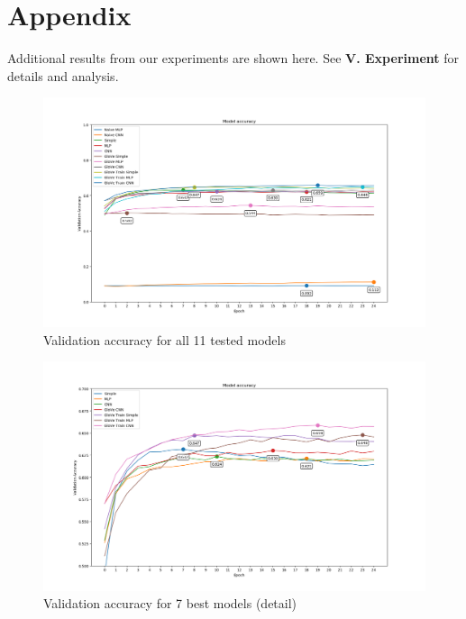 \documentclass[jou,apacite, 10px]{apa6}
\begin{document}
\onecolumn

\section*{Appendix}
Additional results from our experiments are shown here. See \textbf{V. Experiment} for details and analysis.

\begin{figure}[h!]
    \captionsetup{justification=centering}
  \centering
    \includegraphics[width=0.9\columnwidth]{images/all_models_comparison}
  \caption{Validation accuracy for all 11 tested models}
    \label{all_models_comparison}
\end{figure}

\begin{figure}[h!]
    \captionsetup{justification=centering}
    \centering
    \includegraphics[width=0.9\columnwidth]{images/good_models_comparison}
    \caption{Validation accuracy for 7 best models (detail)}
    \label{good_models_comparison_small}
\end{figure}
\end{document}
